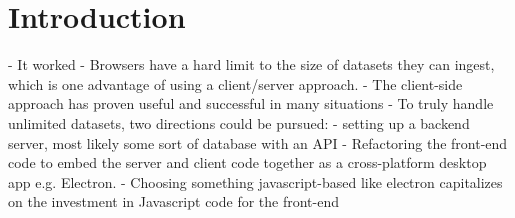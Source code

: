 \section{Introduction}
\label{08-conclusions}

- It worked
- Browsers have a hard limit to the size of datasets they can ingest, which is one advantage of using a client/server approach.
- The client-side approach has proven useful and successful in many situations
- To truly handle unlimited datasets, two directions could be pursued:
  - setting up a backend server, most likely some sort of database with an API
  - Refactoring the front-end code to embed the server and client code together as a cross-platform desktop app e.g. Electron.
  - Choosing something javascript-based like electron capitalizes on the investment in Javascript code for the front-end


